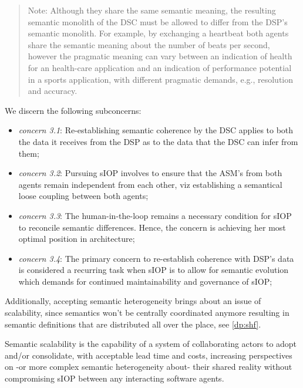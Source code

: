 \documentclass[sort&compress,preprint,authoryear,3p,twocolumn]{elsarticle}
\providecommand{\tightlist}{%
  \setlength{\itemsep}{0pt}\setlength{\parskip}{0pt}}
\begin{document}
\begin{quote}
Note: Although they share the same semantic meaning, the resulting
semantic monolith of the DSC must be allowed to differ from the DSP's
semantic monolith. For example, by exchanging a heartbeat both agents
share the semantic meaning about the number of beats per second, however
the pragmatic meaning can vary between an indication of health for an
health-care application and an indication of performance potential in a
sports application, with different pragmatic demands, e.g., resolution
and accuracy.
\end{quote}

We discern the following subconcerns:

\begin{itemize}
\tightlist
\item
  \emph{concern 3.1}: Re-establishing semantic coherence by the DSC
  applies to both the data it receives from the DSP as to the data that
  the DSC can infer from them;
\item
  \emph{concern 3.2}: Pursuing sIOP involves to ensure that the ASM's
  from both agents remain independent from each other, viz establishing
  a semantical loose coupling between both agents;
\item
  \emph{concern 3.3}: The human-in-the-loop remains a necessary
  condition for sIOP to reconcile semantic differences. Hence, the
  concern is achieving her most optimal position in architecture;
\item
  \emph{concern 3.4}: The primary concern to re-establish coherence with
  DSP's data is considered a recurring task when sIOP is to allow for
  semantic evolution which demands for continued maintainability and
  governance of sIOP;
\end{itemize}

Additionally, accepting semantic heterogeneity brings about an issue of
scalability, since semantics won't be centrally coordinated anymore
resulting in semantic definitions that are distributed all over the
place, see \cref{dp:shf}.

\begin{mmdef}\label{def:semantic-scalability}
Semantic scalability is the capability of a system of collaborating actors to adopt and/or consolidate, with acceptable lead time and costs, increasing perspectives on -or more complex semantic heterogeneity about- their shared reality without compromising sIOP between any interacting software agents. 
\end{mmdef}
\end{document}
